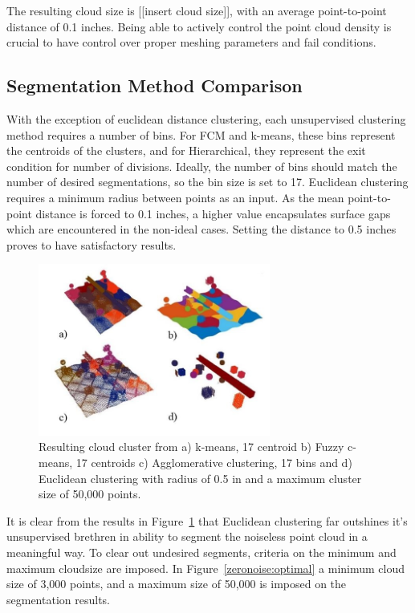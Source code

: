 \documentclass[12pt]{drexelthesis}
\let\Oldsubsection\subsection
\renewcommand{\subsection}{\FloatBarrier\Oldsubsection}
\begin{document}
The resulting cloud size is [[insert cloud size]], with an average point-to-point distance of 0.1 inches. Being able to actively control the point cloud density is crucial to have control over proper meshing parameters and fail conditions.

\subsection{Segmentation Method Comparison}

With the exception of euclidean distance clustering, each unsupervised clustering method requires a number of bins. For FCM and k-means, these bins represent the centroids of the clusters, and for Hierarchical, they represent the exit condition for number of divisions. Ideally, the number of bins should match the number of desired segmentations, so the bin size is set to 17. Euclidean clustering requires a minimum radius between points as an input. As the mean point-to-point distance is forced to 0.1 inches, a higher value encapsulates surface gaps which are encountered in the non-ideal cases. Setting the distance to 0.5 inches proves to have satisfactory results.

\begin{figure}[!ht]
	\label{zeronoise:segcompare}
	\centering
		\includegraphics[width=3in]{simulated-lab-scan/0noise/all_methods.jpg}
		\caption[Comparison of unsupervised segmentation techniques on a simulated dataset.]{\centering Resulting cloud cluster from a) k-means, 17 centroid b) Fuzzy c-means, 17 centroids c) Agglomerative clustering, 17 bins and d) Euclidean clustering with radius of 0.5 in and a maximum cluster size of 50,000 points.}
	\label{zeronoise:compare}
\end{figure}

It is clear from the results in Figure~\ref{zeronoise:compare} that Euclidean clustering far outshines it's unsupervised brethren in ability to segment the noiseless point cloud in a meaningful way. To clear out undesired segments, criteria on the minimum and maximum cloudsize are imposed. In Figure~\ref{zeronoise:optimal} a minimum cloud size of 3,000 points, and a maximum size of 50,000 is imposed on the segmentation results.
\end{document}
